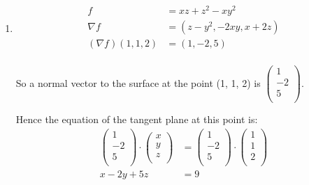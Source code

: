 \documentclass[10pt,\jkfside,a4paper]{article}
\begin{document}
\begin{enumerate}
\begin{enumerate}
\end{enumerate}

\item 
\begin{equation}
\begin{split}
f &= xz + z^2 - xy^2 \\
\nabla f &= \left(z - y^2, -2xy, x + 2z\right) \\
(\nabla f)(1, 1, 2) &= \left(1, -2, 5\right) \\
\end{split}
\end{equation}

So a normal vector to the surface at the point (1, 1, 2) is $\begin{pmatrix} 1 \\ -2 \\ 5 \\ \end{pmatrix}$.

Hence the equation of the tangent plane at this point is:
\begin{equation}
\begin{split}
\begin{pmatrix} 1 \\ -2 \\ 5 \\ \end{pmatrix}\cdot\begin{pmatrix} x \\ y \\ z \\ \end{pmatrix} &= \begin{pmatrix} 1 \\ -2 \\ 5 \\ \end{pmatrix} \cdot \begin{pmatrix} 1 \\ 1 \\ 2 \\ \end{pmatrix} \\
x - 2y + 5z &= 9 \\
\end{split}
\end{equation}


\end{enumerate}
\end{document}
